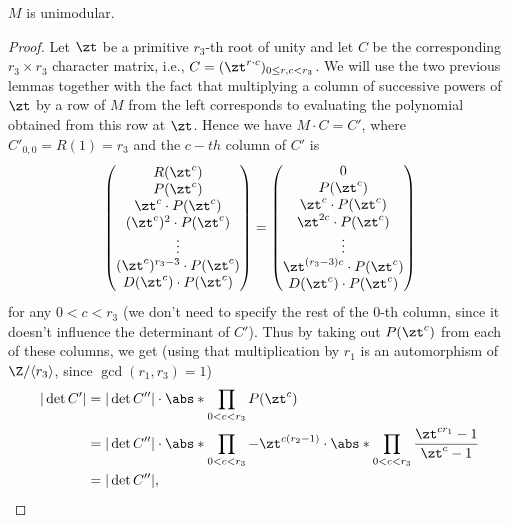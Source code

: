 \begin{prop}\label{unimod}
$M$ is unimodular.
\end{prop}
\begin{proof}
Let $\zt$ be a primitive $r_3$-th root of unity and let $C$ be the corresponding $r_3\times r_3$ character matrix, i.e., $C=(\zt^{r\cdot c})_{0\leq r,c<r_3}$. We will use the two previous lemmas together with the fact that multiplying a column of successive powers of $\zt$ by a row of $M$ from the left corresponds to evaluating the polynomial obtained from this row at $\zt$. %
Hence we have $M\cdot C=C'$, where $C'_{0,0}=R(1)=r_3$ and the $c-th$ column of $C'$ is
$$
\begin{pmatrix}
R(\zt^c)\\ 
P(\zt^c) \\ 
\zt^c \cdot P(\zt^c) \\ 
(\zt^{c})^2 \cdot P(\zt^c) \\ 
\vdots\\ 
(\zt^{c})^{r_3-3} \cdot P(\zt^c) \\ 
D(\zt^c) \cdot P(\zt^c)
\end{pmatrix}
=
\begin{pmatrix}
0\\ 
P(\zt^c) \\ 
\zt^c \cdot P(\zt^c) \\ 
\zt^{2c} \cdot P(\zt^c) \\ 
\vdots\\ 
\zt^{(r_3-3)c} \cdot P(\zt^c) \\ 
D(\zt^c) \cdot P(\zt^c)
\end{pmatrix}
$$
for any $0<c<r_3$ (we don't need to specify the rest of the $0$-th column, since it doesn't influence the determinant of $C'$). Thus by taking out $P(\zt^c)$ from each of these columns, we get (using that multiplication by $r_1$ is an automorphism of $\Z/\langle r_3\rangle$, since $\gcd(r_1,r_3)=1$)
\begin{align*}
|\det C'|&=|\det C''|\cdot\abs*{\prod_{0<c<r_3}P(\zt^c)}\\
&=|\det C''|\cdot\abs*{\prod_{0<c<r_3}-\zt^{c(r_2-1)}}\cdot\abs*{\prod_{0<c<r_3}\frac{\zt^{cr_1}-1}{\zt^c-1}}\\
&=|\det C''|,
\end{align*}


\end{proof}
